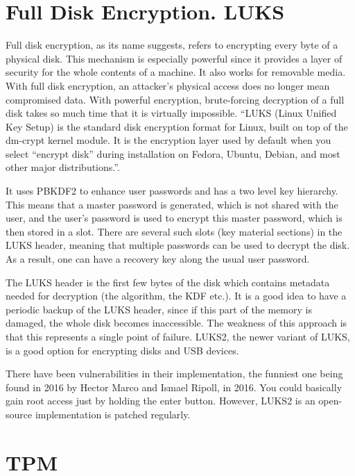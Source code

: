 \section{Full Disk Encryption. LUKS} \label{lab:ch3-luks}

Full disk encryption, as its name suggests, refers to encrypting every byte of a physical disk.
This mechanism is especially powerful since it provides a layer of security for the whole contents of a machine.
It also works for removable media.
With full disk encryption, an attacker's physical access does no longer mean compromised data.
With powerful encryption, brute-forcing decryption of a full disk takes so much time that it is virtually impossible.
``LUKS (Linux Unified Key Setup) is the standard disk encryption format for Linux, built on top of the dm-crypt kernel module.
It is the encryption layer used by default when you select “encrypt disk” during installation on Fedora, Ubuntu, Debian, and most other major distributions.''\cite{luks-explained}.

It uses PBKDF2 to enhance user passwords and has a two level key hierarchy\cite{luks}.
This means that a master password is generated, which is not shared with the user, and the user's password is used to encrypt this master password, which is then stored in a slot.
There are several such slots (key material sections) in the LUKS header, meaning that multiple passwords can be used to decrypt the disk.
As a result, one can have a recovery key along the usual user password.

The LUKS header is the first few bytes of the disk which contains metadata needed for decryption (the algorithm, the KDF etc.).
It is a good idea to have a periodic backup of the LUKS header, since if this part of the memory is damaged, the whole disk becomes inaccessible.
The weakness of this approach is that this represents a single point of failure.
LUKS2, the newer variant of LUKS, is a good option for encrypting disks and USB devices.

There have been vulnerabilities in their implementation, the funniest one being found in 2016 by Hector Marco and Ismael Ripoll, in 2016\cite{luks-cve}.
You could basically gain root access just by holding the enter button.
However, LUKS2 is an open-source implementation is patched regularly.



\section{TPM} \label{lab:ch3-tpm}

